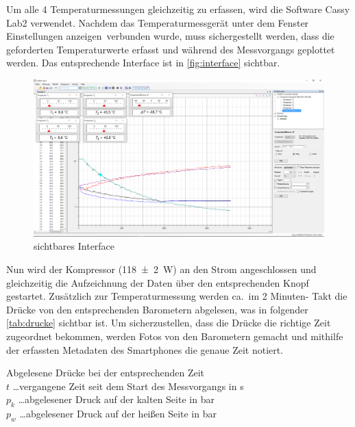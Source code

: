 \documentclass[12pt,english,ngerman]{scrartcl}
\begin{document}
Um alle 4 Temperaturmessungen gleichzeitig zu erfassen, wird die Software Cassy
Lab2 verwendet. Nachdem das Temperaturmessgerät unter dem Fenster \dq
Einstellungen anzeigen\dq \ verbunden wurde, muss sichergestellt werden, dass
die geforderten Temperaturwerte erfasst und während des Messvorgangs geplottet
werden. Das entsprechende Interface ist in \autoref{fig:interface} sichtbar.
\begin{figure}[H]
	\begin{center}
		\includegraphics[width =\textwidth]{./figures/interface.PNG}
	\end{center}
	\caption{sichtbares Interface
	}\label{fig:interface}
\end{figure}

Nun wird der Kompressor (\SI{118(2)}{\watt}) an den Strom angeschlossen und
gleichzeitig die Aufzeichnung der Daten über den entsprechenden Knopf
gestartet. Zusätzlich zur Temperaturmessung werden ca.\ im 2 Minuten- Takt die
Drücke von den entsprechenden Barometern abgelesen, was in folgender
\autoref{tab:drucke} sichtbar ist. Um sicherzustellen, dass die Drücke die
richtige Zeit zugeordnet bekommen, werden Fotos von den Barometern gemacht und
mithilfe der erfassten Metadaten des Smartphones die genaue Zeit notiert.

\begin{table}[H]
	\caption[Abgelesene Drücke bei der entsprechenden Zeit]{Abgelesene Drücke bei der
		entsprechenden Zeit                                            \\
		$t$ \dots vergangene Zeit seit dem Start des Messvorgangs in s \\
		$p_k$ \dots abgelesener Druck auf der kalten Seite in bar      \\
		$p_w$ \dots abgelesener Druck auf der heißen Seite in bar
	}\label{tab:drucke}
	\centering
	
\end{table}
\end{document}
